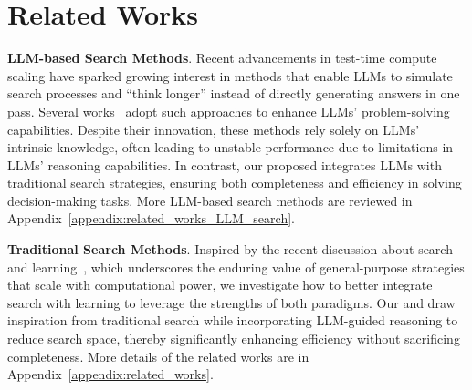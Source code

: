 \section{Related Works}
\label{sec:related_works}
\textbf{LLM-based Search Methods}.  
Recent advancements in test-time compute scaling have sparked growing interest in methods that enable LLMs to simulate search processes and ``think longer'' instead of directly generating answers in one pass. Several works~\cite{wang2023selfconsistency,hao2023reasoning,feng2023alphazerolike,yao2023tree,zhao2024large,besta2024got,wang2024litesearch,snell2024scaling} adopt such approaches to enhance LLMs' problem-solving capabilities. 
Despite their innovation, these methods rely solely on LLMs' intrinsic knowledge, often leading to unstable performance due to limitations in LLMs' reasoning capabilities. In contrast, our proposed \method integrates LLMs with traditional search strategies, ensuring both completeness and efficiency in solving decision-making tasks. More LLM-based search methods are reviewed in Appendix~\ref{appendix:related_works_LLM_search}.

\noindent \textbf{Traditional Search Methods}.  
Inspired by the recent discussion about search and learning~\cite{Sutton2019BitterLesson}, which underscores the enduring value of general-purpose strategies that scale with computational power, we investigate how to better integrate search with learning to leverage the strengths of both paradigms. Our \method and \cmethod draw inspiration from traditional search while incorporating LLM-guided reasoning to reduce search space, thereby significantly enhancing efficiency without sacrificing completeness. More details of the related works are in Appendix~\ref{appendix:related_works}. 